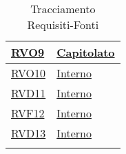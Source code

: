 \begin{longtable}{|>{\centering}m{5cm}|m{5cm}<{\centering}|}
\hyperlink{RVO9}{RVO9} & \hyperlink{Capitolato}{Capitolato}\\ \hline

\hyperlink{RVO10}{RVO10} & \hyperlink{Interno}{Interno}\\ \hline

\hyperlink{RVD11}{RVD11} & \hyperlink{Interno}{Interno}\\ \hline

\hyperlink{RVF12}{RVF12} & \hyperlink{Interno}{Interno}\\ \hline

\hyperlink{RVD13}{RVD13} & \hyperlink{Interno}{Interno}\\ \hline

\caption[Tracciamento Requisiti-Fonti]{Tracciamento Requisiti-Fonti}
\label{tabella:requi-fonti}
\end{longtable}
\clearpage
